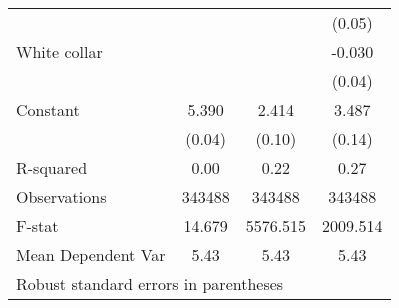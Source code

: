 {\begin{tabular}{l*{3}{c}}
                    &                     &                     &      (0.05)         \\
White collar        &                     &                     &      -0.030         \\
                    &                     &                     &      (0.04)         \\
Constant            &       5.390\sym{***}&       2.414\sym{***}&       3.487\sym{***}\\
                    &      (0.04)         &      (0.10)         &      (0.14)         \\
\hline
R-squared           &        0.00         &        0.22         &        0.27         \\
Observations        &      343488         &      343488         &      343488         \\
F-stat              &      14.679         &    5576.515         &    2009.514         \\
Mean Dependent Var  &        5.43         &        5.43         &        5.43         \\
\hline\hline
\multicolumn{4}{l}{\footnotesize Robust standard errors in parentheses}\\
\end{tabular}
}
